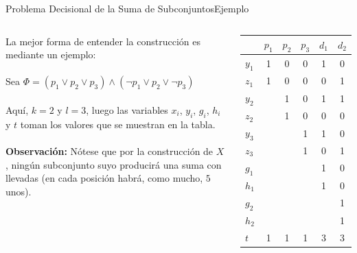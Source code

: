 \documentclass[10pt, envcountsect, presentation, aspectratio=169]{beamer}
\begin{document}
\begin{frame}{Problema Decisional de la Suma de Subconjuntos}{Ejemplo}
    \begin{columns}
        La mejor forma de entender la construcción es mediante un ejemplo:\\~\\
        Sea $\Phi = (p_{1} \vee p_{2} \vee p_{3})\wedge (\neg p_{1} \vee p_{2} \vee \neg p_{3})$\\~\\
        Aquí, $k=2$ y $l=3$, luego las variables $x_i$, $y_i$, $g_i$, $h_i$ y $t$ toman los valores que se muestran en la tabla.\\~\\
        \textbf{Observación:} Nótese que por la construcción de $X$, ningún subconjunto suyo producirá una suma con llevadas (en cada posición habrá, como mucho, $5$ unos).
        \small
        \begin{center}
        \renewcommand{\arraystretch}{1.2}
        \begin{tabular}{l|*{3}{c}|*{2}{c}}
         & $p_1$ & $p_2$ & $p_3$ & $d_1$ & $d_2$ \\
        \midrule
        $y_1$ & 1 & 0 & 0 & 1 & 0 \\
        $z_1$ & 1 & 0 & 0 & 0 & 1 \\
        $y_2$ &   & 1 & 0 & 1 & 1 \\
        $z_2$ &   & 1 & 0 & 0 & 0 \\
        $y_3$ &   &   & 1 & 1 & 0 \\
        $z_3$ &   &   & 1 & 0 & 1 \\
        \midrule
        $g_1$ &   &   &   & 1 & 0 \\
        $h_1$ &   &   &   & 1 & 0 \\
        $g_2$ &   &   &   &   & 1 \\
        $h_2$ &   &   &   &   & 1 \\
        \midrule
        $t$   & 1 & 1 & 1 & 3 & 3 \\
        \end{tabular}
        \end{center}
    \end{columns}
\end{frame}
\end{document}
